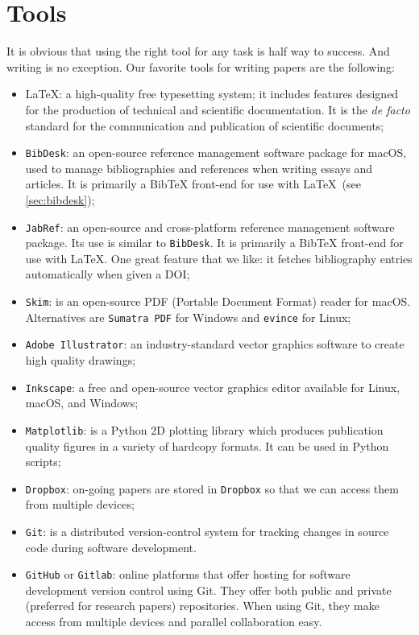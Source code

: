 \documentclass[authoryear,3p,times,preprint,review,fleqn]{elsarticle}
\numberwithin{equation}{section}
\theoremstyle{remark}
\begin{document}
\section{Tools}\label{sec:tools}

It is obvious that using the right tool for any task is half way to success. And writing is no exception. Our favorite tools for writing papers are the following:

\begin{itemize}
\item \LaTeX:  a high-quality free typesetting system; it includes features designed for the production of technical and scientific documentation. It is the \textit{de facto} standard for the communication and publication of scientific documents; 
\item \texttt{BibDesk}: an open-source reference management software package for macOS, used to manage bibliographies and references when writing essays and articles. It is primarily a BibTeX front-end for use with \LaTeX\ (see \cref{sec:bibdesk});
\item \texttt{JabRef}:  an open-source and cross-platform reference management software package. Its use is similar to \texttt{BibDesk}. It is primarily a BibTeX front-end for use with \LaTeX. One great feature that we like: it fetches bibliography entries automatically when given a DOI;
\item \texttt{Skim}: is an open-source PDF (Portable Document Format) reader for macOS. Alternatives are \texttt{Sumatra PDF} for Windows and \texttt{evince} for Linux;
\item \texttt{Adobe Illustrator}: an industry-standard vector graphics software to create high quality drawings;
\item \texttt{Inkscape}: a free and open-source vector graphics editor available for Linux, macOS, and Windows;
\item \texttt{Matplotlib}: is a Python 2D plotting library which produces publication quality figures in a variety of hardcopy formats. It can be used in Python scripts;
\item \texttt{Dropbox}: on-going papers are stored in \texttt{Dropbox} so that we can access them from multiple devices;
\item \texttt{Git}: is a distributed version-control system for tracking changes in source code during software development.
\item \texttt{GitHub} or \texttt{Gitlab}: online platforms that offer hosting for software development version control using Git. They offer both public and private (preferred for research papers) repositories. When using Git, they make access from multiple devices and parallel collaboration easy.
\end{itemize}
\end{document}
